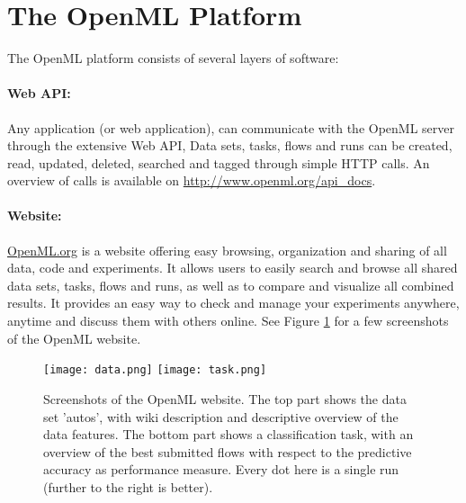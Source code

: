 \section{The OpenML Platform}
\label{sec:server}

The OpenML platform consists of several layers of software:

\paragraph{Web API:}
Any application (or web application), can communicate with the OpenML server 
through the extensive Web API, 
Data sets, tasks, 
flows and runs can be created, read, updated, deleted, searched and tagged 
through simple HTTP calls. An overview of calls is available on 
\url{http://www.openml.org/api_docs}.

\paragraph{Website:}
\href{http://openml.org}{OpenML.org} is a website offering easy browsing, 
organization and sharing of all data, code and experiments. It allows users to 
easily search and browse all shared data sets, tasks, flows and runs, as well 
as to compare and visualize all combined results. It provides an easy way to 
check and manage your experiments anywhere, anytime and discuss them with 
others online. See Figure \ref{screenshot} for a few screenshots of the OpenML 
website.
\begin{figure}[p]
\begin{center}
\noindent \texttt{[image: data.png]}
\texttt{[image: task.png]}
\caption{Screenshots of the OpenML website. The top part shows the data set 
'autos', with wiki description and descriptive overview of the data features. 
The bottom part shows a classification task, with an overview of the best 
submitted flows with respect to the predictive accuracy as performance measure. 
Every dot here is a single run (further to the right is better).}
\label{screenshot}
\end{center}
\end{figure}


